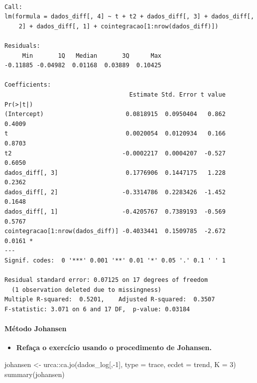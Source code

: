 \documentclass[
  letterpaper,
  DIV=11,
  numbers=noendperiod]{scrartcl}
\let\oldparagraph\paragraph
\renewcommand{\paragraph}[1]{\oldparagraph{#1}\mbox{}}
\newenvironment{Shaded}{\begin{snugshade}}{\end{snugshade}}
\newcommand{\AttributeTok}[1]{\textcolor[rgb]{0.40,0.45,0.13}{#1}}
\newcommand{\DecValTok}[1]{\textcolor[rgb]{0.68,0.00,0.00}{#1}}
\newcommand{\FunctionTok}[1]{\textcolor[rgb]{0.28,0.35,0.67}{#1}}
\newcommand{\NormalTok}[1]{\textcolor[rgb]{0.00,0.23,0.31}{#1}}
\newcommand{\OtherTok}[1]{\textcolor[rgb]{0.00,0.23,0.31}{#1}}
\newcommand{\SpecialCharTok}[1]{\textcolor[rgb]{0.37,0.37,0.37}{#1}}
\newcommand{\StringTok}[1]{\textcolor[rgb]{0.13,0.47,0.30}{#1}}
\providecommand{\tightlist}{%
  \setlength{\itemsep}{0pt}\setlength{\parskip}{0pt}}\usepackage{longtable,booktabs,array}
\begin{document}
\begin{verbatim}

Call:
lm(formula = dados_diff[, 4] ~ t + t2 + dados_diff[, 3] + dados_diff[, 
    2] + dados_diff[, 1] + cointegracao[1:nrow(dados_diff)])

Residuals:
     Min       1Q   Median       3Q      Max 
-0.11885 -0.04982  0.01168  0.03889  0.10425 

Coefficients:
                                   Estimate Std. Error t value Pr(>|t|)  
(Intercept)                       0.0818915  0.0950404   0.862   0.4009  
t                                 0.0020054  0.0120934   0.166   0.8703  
t2                               -0.0002217  0.0004207  -0.527   0.6050  
dados_diff[, 3]                   0.1776906  0.1447175   1.228   0.2362  
dados_diff[, 2]                  -0.3314786  0.2283426  -1.452   0.1648  
dados_diff[, 1]                  -0.4205767  0.7389193  -0.569   0.5767  
cointegracao[1:nrow(dados_diff)] -0.4033441  0.1509785  -2.672   0.0161 *
---
Signif. codes:  0 '***' 0.001 '**' 0.01 '*' 0.05 '.' 0.1 ' ' 1

Residual standard error: 0.07125 on 17 degrees of freedom
  (1 observation deleted due to missingness)
Multiple R-squared:  0.5201,    Adjusted R-squared:  0.3507 
F-statistic: 3.071 on 6 and 17 DF,  p-value: 0.03184
\end{verbatim}

\newpage

\hypertarget{muxe9todo-johansen}{%
\paragraph{Método Johansen}\label{muxe9todo-johansen}}

\begin{itemize}
\tightlist
\item
  \textbf{Refaça o exercício usando o procedimento de Johansen.}
\end{itemize}

\begin{Shaded}
\begin{Highlighting}[]
\NormalTok{johansen }\OtherTok{\textless{}{-}}\NormalTok{ urca}\SpecialCharTok{::}\FunctionTok{ca.jo}\NormalTok{(dados\_log[,}\SpecialCharTok{{-}}\DecValTok{1}\NormalTok{], }\AttributeTok{type =} \StringTok{\textquotesingle{}trace\textquotesingle{}}\NormalTok{, }\AttributeTok{ecdet =} \StringTok{\textquotesingle{}trend\textquotesingle{}}\NormalTok{, }\AttributeTok{K =} \DecValTok{3}\NormalTok{)}
\FunctionTok{summary}\NormalTok{(johansen)}
\end{Highlighting}
\end{Shaded}
\end{document}
